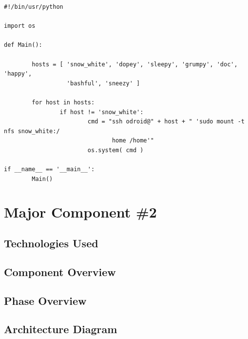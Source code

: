 \begin{lstlisting}
#!/bin/usr/python

import os

def Main():

        hosts = [ 'snow_white', 'dopey', 'sleepy', 'grumpy', 'doc', 'happy',
 				  'bashful', 'sneezy' ]

        for host in hosts:
                if host != 'snow_white':
                        cmd = "ssh odroid@" + host + " 'sudo mount -t nfs snow_white:/
							   home /home'"
                        os.system( cmd )

if __name__ == '__main__':
        Main()
\end{lstlisting}

\section{Major Component \#2 }

\subsection{Technologies  Used}

\subsection{Component  Overview}

\subsection{Phase Overview}

\subsection{ Architecture  Diagram}



